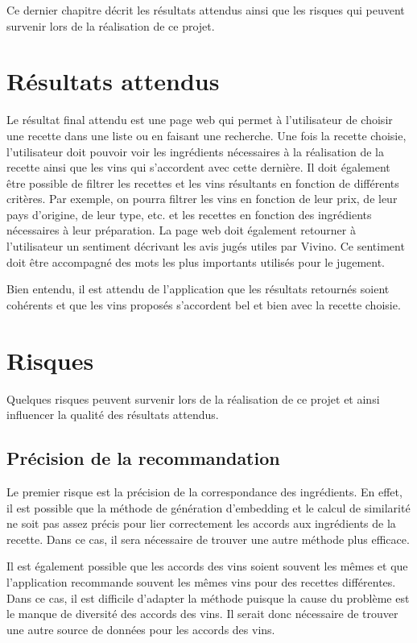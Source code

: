 Ce dernier chapitre décrit les résultats attendus ainsi que les risques qui peuvent survenir lors de la réalisation de ce projet.

\section{Résultats attendus}

Le résultat final attendu est une page web qui permet à l'utilisateur de choisir une recette dans une liste ou en faisant une recherche. Une fois la recette choisie, l'utilisateur doit pouvoir voir les ingrédients nécessaires à la réalisation de la recette ainsi que les vins qui s'accordent avec cette dernière. Il doit également être possible de filtrer les recettes et les vins résultants en fonction de différents critères. Par exemple, on pourra filtrer les vins en fonction de leur prix, de leur pays d'origine, de leur type, etc. et les recettes en fonction des ingrédients nécessaires à leur préparation. La page web doit également retourner à l'utilisateur un sentiment décrivant les avis jugés utiles par Vivino. Ce sentiment doit être accompagné des mots les plus importants utilisés pour le jugement.

Bien entendu, il est attendu de l'application que les résultats retournés soient cohérents et que les vins proposés s'accordent bel et bien avec la recette choisie.

\section{Risques}

Quelques risques peuvent survenir lors de la réalisation de ce projet et ainsi influencer la qualité des résultats attendus.

\subsection{Précision de la recommandation}

Le premier risque est la précision de la correspondance des ingrédients. En effet, il est possible que la méthode de génération d'embedding et le calcul de similarité ne soit pas assez précis pour lier correctement les accords aux ingrédients de la recette. Dans ce cas, il sera nécessaire de trouver une autre méthode plus efficace. 

Il est également possible que les accords des vins soient souvent les mêmes et que l'application recommande souvent les mêmes vins pour des recettes différentes. Dans ce cas, il est difficile d'adapter la méthode puisque la cause du problème est le manque de diversité des accords des vins. Il serait donc nécessaire de trouver une autre source de données pour les accords des vins.

